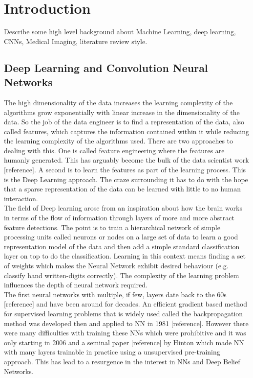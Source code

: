 \chapter{Introduction}

Describe some high level background about Machine Learning, deep learning, CNNs, Medical Imaging, literature review style.

\section{Deep Learning and Convolution Neural Networks}

The high dimensionality of the data increases the learning complexity of the algorithms grow exponentially with linear increase in the dimensionality of the data. So the job of the data engineer is to find a representation of the data, also called features, which captures the information contained within it while reducing the learning complexity of the algorithms used. There are two approaches to dealing with this. One is called feature engineering where the features are humanly generated. This has arguably become the bulk of the data scientist work [reference]. A second is to learn the features as part of the learning process. This is the Deep Learning approach. The craze surrounding it has to do with the hope that a sparse representation of the data can be learned with little to no human interaction.\\

The field of Deep learning arose from an inspiration about how the brain works in terms of the flow of information through layers of more and more abstract feature detections. The point is to train a hierarchical network of simple processing units called neurons or nodes on a large set of data to learn a good representation model of the data and then add a simple standard classification layer on top to do the classification. Learning in this context means finding a set of weights which makes the Neural Network exhibit desired behaviour (e.g. classify hand written-digits correctly). The complexity of the learning problem influences the depth of neural network required.\\

The first neural networks with multiple, if few, layers date back to the 60s [reference] and have been around for decades. An efficient gradient based method for supervised learning problems that is widely used called the backpropagation method was developed then and applied to NN in 1981 [reference]. However there were many difficulties with training these NNs which were prohibitive and it was only starting in 2006 and a seminal paper [reference] by Hinton which made NN with many layers trainable in practice using a unsupervised pre-training approach. This has lead to a resurgence in the interest in NNs and Deep Belief Networks. \\

